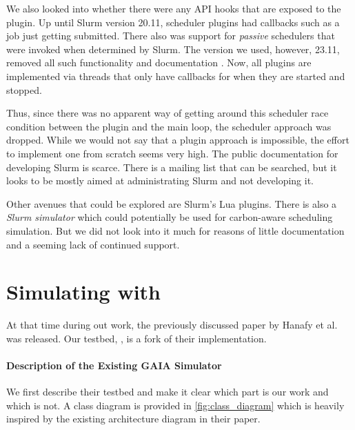 We also looked into whether there were any API hooks that are exposed to the plugin. 
Up until Slurm version 20.11, scheduler plugins had callbacks such as a job just getting submitted. 
There also was support for \emph{passive} schedulers that were invoked when determined by Slurm.
The version we used, however,  23.11, removed all such functionality and documentation .  
Now, all plugins are implemented via threads that only have callbacks for when they are started and stopped.

Thus, since there was no apparent way of getting around this scheduler race condition between the plugin and the main loop, the scheduler approach was dropped. 
While we would not say that a plugin approach is impossible, the effort to implement one from scratch seems very high. 
The public documentation for developing Slurm is scarce. 
There is a mailing list that can be searched, but it looks to be mostly aimed at administrating Slurm and not developing it.

Other avenues that could be explored are Slurm's Lua plugins. 
There is also a \emph{Slurm simulator}  which could potentially be used for carbon-aware scheduling simulation.
But we did not look into it much for reasons of little documentation and a seeming lack of continued support.

\section{Simulating with \programname{}}

At that time during out work, the previously discussed paper by Hanafy et al. \cite{hanafy_going_2024} was released. 
Our testbed, \emph{\programname{}}, is a fork of their implementation.

\paragraph{Description of the Existing GAIA Simulator}

We first describe their testbed and make it clear which part is our work and which is not. A class diagram is provided in \ref{fig:class_diagram} which is heavily inspired by the existing architecture diagram in their paper. 

